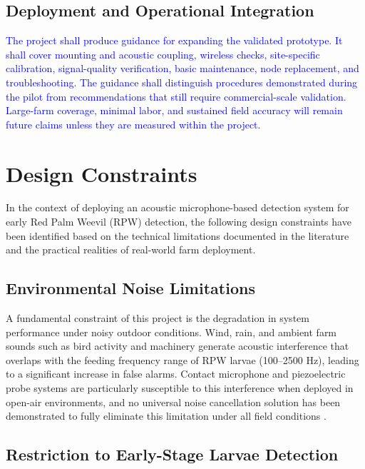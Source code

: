 \documentclass[12pt,a4paper,oneside]{memoir}
\newcommand{\earlierrevision}[1]{\textcolor{blue}{#1}}
\begin{document}
\subsection{Deployment and Operational Integration}
 
\earlierrevision{The project shall produce guidance for expanding the validated prototype. It shall cover mounting and acoustic coupling, wireless checks, site-specific calibration, signal-quality verification, basic maintenance, node replacement, and troubleshooting. The guidance shall distinguish procedures demonstrated during the pilot from recommendations that still require commercial-scale validation. Large-farm coverage, minimal labor, and sustained field accuracy will remain future claims unless they are measured within the project.}
 
\section{Design Constraints}
\label{sec:Constraints}
 
In the context of deploying an acoustic microphone-based detection system for early Red Palm Weevil (RPW) detection, the following design constraints have been identified based on the technical limitations documented in the literature and the practical realities of real-world farm deployment.
 
\subsection{Environmental Noise Limitations}
 
A fundamental constraint of this project is the degradation in system performance under noisy outdoor conditions. Wind, rain, and ambient farm sounds such as bird activity and machinery generate acoustic interference that overlaps with the feeding frequency range of RPW larvae (100--2500 Hz), leading to a significant increase in false alarms. Contact microphone and piezoelectric probe systems are particularly susceptible to this interference when deployed in open-air environments, and no universal noise cancellation solution has been demonstrated to fully eliminate this limitation under all field conditions \cite{pinhas2008,karar2022,ashry2022cnn}.
 
\subsection{Restriction to Early-Stage Larvae Detection}
 
\end{document}
